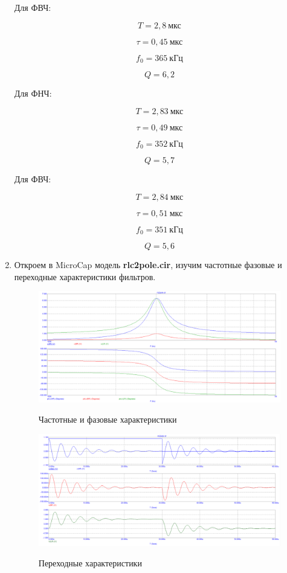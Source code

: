 \documentclass[a4paper, 12pt]{article}%
\begin{document}
\begin{enumerate}
Для ФВЧ:

\[T = 2,8 \: \textit{мкс}\]

\[\tau = 0,45 \: \textit{мкс}\]

\[f_0 = 365 \: \textit{кГц}\]

\[Q = 6,2\]

Для ФНЧ:

\[T = 2,83 \: \textit{мкс}\]

\[\tau = 0,49 \: \textit{мкс}\]

\[f_0 = 352 \: \textit{кГц}\]

\[Q = 5,7\]

Для ФВЧ:

\[T = 2,84 \: \textit{мкс}\]

\[\tau = 0,51 \: \textit{мкс}\]

\[f_0 = 351 \: \textit{кГц}\]

\[Q = 5,6\]

\item Откроем в MicroCap модель \textbf{rlc2pole.cir}, изучим частотные фазовые и переходные характеристики фильтров.

\begin{figure}[h!]
\centering
\includegraphics[scale=0.4]{rlc2pole_AC1.png}
\label{fig:Image1}
\caption{Частотные и фазовые характеристики}
\end{figure}

\begin{figure}[h!]
\centering
\includegraphics[scale=0.4]{rlc2pole_transient.png}
\label{fig:Image1}
\caption{Переходные характеристики}
\end{figure}


\end{enumerate}
\end{document}
